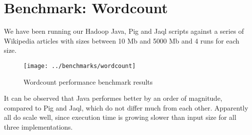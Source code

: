 \clearpage
\section{Benchmark: Wordcount}           

We have been running our Hadoop Java, Pig and Jaql scripts against a series of Wikipedia articles with sizes between 10 Mb and 5000 Mb and 4 runs for each size.

\begin{figure}[H]
  \begin{center}
    \texttt{[image: ../benchmarks/wordcount]}
  \end{center}
  \caption{Wordcount performance benchmark results}
  \label{fig:reducers}
\end{figure}

It can be observed that Java performes better by an order of magnitude, compared to Pig and Jaql, which do not differ much from each other. Apparently all do scale well, since execution time is growing slower than input size for all three implementations.